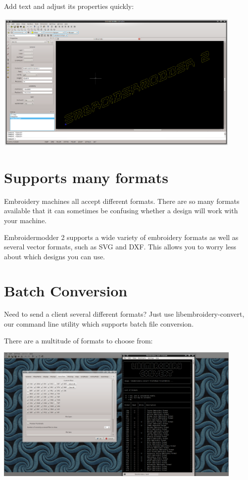 \documentclass{report}
\begin{document}
Add text and adjust its properties quickly:

\includegraphics[width=0.9\textwidth]{images/features-text-1.png}

\section{Supports many formats}

Embroidery machines all accept different formats. There are so many formats available that it can sometimes be confusing whether a design will work with your machine.

Embroidermodder 2 supports a wide variety of embroidery formats as well as several vector formats, such as SVG and DXF. This allows you to worry less about which designs you can use.

\section{Batch Conversion}

Need to send a client several different formats? Just use libembroidery-convert, our command line utility which supports batch file conversion.

There are a multitude of formats to choose from:

\includegraphics[width=0.9\textwidth]{images/features-formats-1.png}
\end{document}

